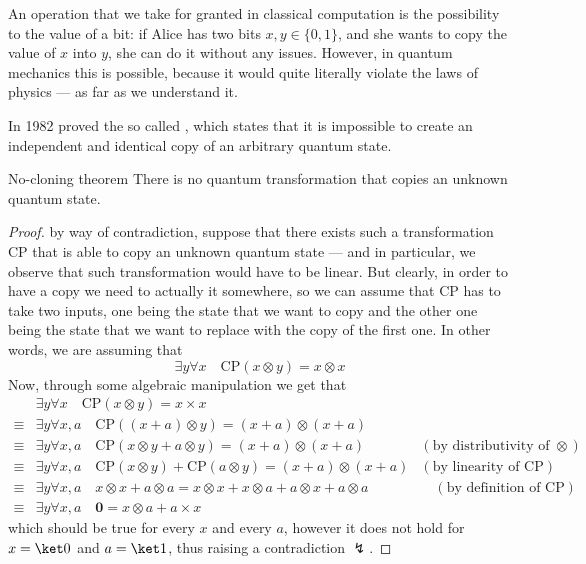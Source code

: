 \documentclass[a4paper, 12pt]{report}
\begin{document}
An operation that we take for granted in classical computation is the possibility to  the value of a bit: if Alice has two bits $x, y \in \{0, 1\}$, and she wants to copy the value of $x$ into $y$, she can do it without any issues. However, in quantum mechanics this is  possible, because it would quite literally violate the laws of physics --- as far as we understand it.

In 1982 \textcite{nocloning} proved the so called , which states that it is impossible to create an independent and identical copy of an arbitrary  quantum state.

\begin{framedthm}{No-cloning theorem}
	There is no quantum transformation that copies an unknown quantum state.
\end{framedthm}

\begin{proof}
	by way of contradiction, suppose that there exists such a transformation CP that is able to copy an unknown quantum state --- and in particular, we observe that such transformation would have to be linear. But clearly, in order to have a copy we need to actually  it somewhere, so we can assume that CP has to take two inputs, one being the state that we want to copy and the other one being the state that we want to replace with the copy of the first one. In other words, we are assuming that $$\exists y \forall x \quad \mbox{CP}(x \otimes y) = x \otimes x$$ Now, through some algebraic manipulation we get that
	\begin{equation*}
		\begin{alignedat}{2}
			       & \exists y \forall x \quad \mbox{CP}(x \otimes y) = x \times x                                                  &                                         \\
			\equiv & \exists y \forall x, a \quad \mbox{CP}((x + a) \otimes y) = (x + a) \otimes (x + a)                            &                                         \\
			\equiv & \exists y \forall x, a \quad \mbox{CP}(x \otimes y + a \otimes y) = (x + a) \otimes (x + a)                    & (\mbox{by distributivity of $\otimes$}) \\
			\equiv & \exists y \forall x, a \quad \mbox{CP}(x \otimes y) + \mbox{CP}(a \otimes y) = (x + a) \otimes (x + a)         & (\mbox{by linearity of CP})             \\
			\equiv & \exists y \forall x, a \quad x \otimes x + a \otimes a = x \otimes x + x \otimes a + a \otimes x + a \otimes a & \quad (\mbox{by definition of CP})      \\
			\equiv & \exists y \forall x, a \quad \mathbf 0 = x \otimes a + a \times x
		\end{alignedat}
	\end{equation*}
	which should be true for every $x$ and every $a$, however it does not hold for $x = \ket 0$ and $a = \ket 1$, thus raising a contradiction $\lightning$.
\end{proof}
\end{document}

